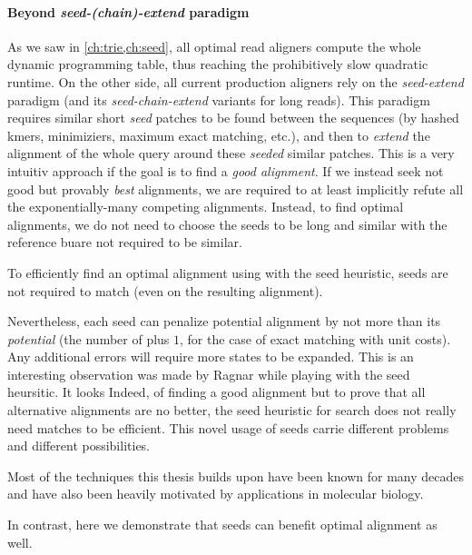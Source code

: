 \paragraph{Beyond \emph{seed-(chain)-extend} paradigm}

As we saw in \cref{ch:trie,ch:seed}, all optimal read aligners compute the whole
dynamic programming table, thus reaching the prohibitively slow quadratic
runtime. On the other side, all current production aligners rely on the
\emph{seed-extend} paradigm (and its \emph{seed-chain-extend} variants for long
reads).
%
This paradigm requires similar short \emph{seed} patches to be found
between the sequences (\AG by hashed kmers, minimiziers, maximum exact matching,
etc.), and then to \emph{extend} the alignment of the whole query around these
\emph{seeded} similar patches. This is a very intuitiv approach if the goal is
to find a \emph{good alignment}.
%
If we instead seek not good but provably \emph{best} alignments, we are required
to at least implicitly refute all the exponentially-many competing alignments.
%
Instead, to find optimal alignments, we do not need to choose the seeds to be
long and similar with the reference buare not required to be similar.
%
\begin{observation}
    To efficiently find an optimal alignment using \A with the seed heuristic,
    seeds are not required to match (even on the resulting alignment).
\end{observation}
%
Nevertheless, each seed can penalize potential alignment by not more than its
\emph{potential} (\ie the number of plus $1$, for the case of exact matching
with unit costs). Any additional errors will require more states to be expanded.
%
This is an interesting observation was made by Ragnar while playing with the
seed heursitic. It looks Indeed, of finding a good alignment but to prove that all
alternative alignments are no better, the seed heuristic for \A search does not
really need matches to be efficient.
%
This novel usage of seeds carrie different problems and different possibilities.

Most of the techniques this thesis builds upon have been known for many decades
and have also been heavily motivated by applications in molecular biology. 

In contrast, here we demonstrate that seeds can benefit optimal alignment as
well.

